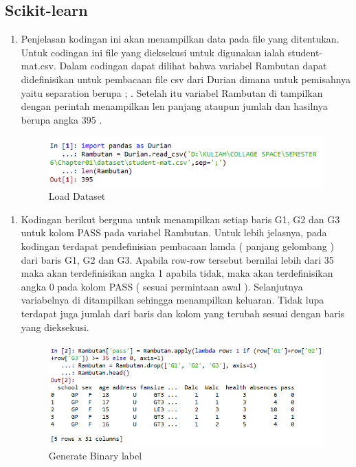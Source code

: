 \subsection{Scikit-learn}
\begin{enumerate}
\item Penjelasan kodingan ini akan menampilkan data pada file yang ditentukan. Untuk codingan ini file yang dieksekusi untuk digunakan ialah student-mat.csv. Dalam codingan dapat dilihat bahwa variabel Rambutan dapat  didefinisikan untuk pembacaan file csv dari  Durian  dimana untuk pemisahnya yaitu separation berupa ; . Setelah itu variabel Rambutan di tampilkan dengan perintah menampilkan len panjang ataupun jumlah dan hasilnya berupa angka 395 . 
\begin{figure}[ht]
\centering
\includegraphics[scale=0.5]{figures/no1.png}
\caption{Load Dataset}
\label{Hasil}
\end{figure}
\end{enumerate}

\begin{enumerate}
\item Kodingan berikut berguna untuk menampilkan setiap baris  G1, G2 dan G3 untuk kolom PASS pada variabel Rambutan. Untuk lebih jelasnya, pada kodingan terdapat pendefinisian pembacaan lamda ( panjang gelombang ) dari baris G1, G2 dan G3. Apabila row-row tersebut bernilai lebih dari 35 maka akan terdefinisikan angka 1 apabila tidak, maka akan terdefinisikan angka 0 pada kolom PASS ( sesuai permintaan awal ). Selanjutnya variabelnya di ditampilkan sehingga menampilkan keluaran. Tidak lupa terdapat juga jumlah dari baris dan kolom yang terubah sesuai dengan baris yang dieksekusi.
\begin{figure}[ht]
\centering
\includegraphics[scale=0.5]{figures/no2.png}
\caption{Generate Binary label}
\label{Hasil}
\end{figure}
\end{enumerate}

